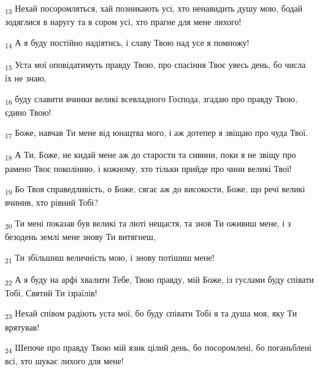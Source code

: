 \begin{tcolorbox}
\textsubscript{13} Нехай посоромляться, хай позникають усі, хто ненавидить душу мою, бодай зодяглися в наругу та в сором усі, хто прагне для мене лихого!
\end{tcolorbox}
\begin{tcolorbox}
\textsubscript{14} А я буду постійно надіятись, і славу Твою над усе я помножу!
\end{tcolorbox}
\begin{tcolorbox}
\textsubscript{15} Уста мої оповідатимуть правду Твою, про спасіння Твоє увесь день, бо числа їх не знаю,
\end{tcolorbox}
\begin{tcolorbox}
\textsubscript{16} буду славити вчинки великі всевладного Господа, згадаю про правду Твою, єдино Твою!
\end{tcolorbox}
\begin{tcolorbox}
\textsubscript{17} Боже, навчав Ти мене від юнацтва мого, і аж дотепер я звіщаю про чуда Твої.
\end{tcolorbox}
\begin{tcolorbox}
\textsubscript{18} А Ти, Боже, не кидай мене аж до старости та сивини, поки я не звіщу про рамено Твоє поколінню, і кожному, хто тільки прийде про чини великі Твої!
\end{tcolorbox}
\begin{tcolorbox}
\textsubscript{19} Бо Твоя справедливість, о Боже, сягає аж до високости, Боже, що речі великі вчинив, хто рівний Тобі?
\end{tcolorbox}
\begin{tcolorbox}
\textsubscript{20} Ти мені показав був великі та люті нещастя, та знов Ти оживиш мене, і з безодень землі мене знову Ти витягнеш,
\end{tcolorbox}
\begin{tcolorbox}
\textsubscript{21} Ти збільшиш величність мою, і знову потішиш мене!
\end{tcolorbox}
\begin{tcolorbox}
\textsubscript{22} А я буду на арфі хвалити Тебе, Твою правду, мій Боже, із гуслами буду співати Тобі, Святий Ти ізраїлів!
\end{tcolorbox}
\begin{tcolorbox}
\textsubscript{23} Нехай співом радіють уста мої, бо буду співати Тобі я та душа моя, яку Ти врятував!
\end{tcolorbox}
\begin{tcolorbox}
\textsubscript{24} Шепоче про правду Твою мій язик цілий день, бо посоромлені, бо поганьблені всі, хто шукає лихого для мене!
\end{tcolorbox}
